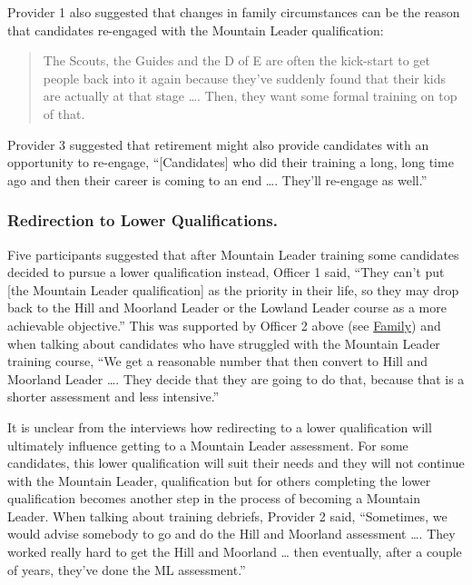 \documentclass[
  12pt,
  a4paper,
]{book}
\begin{document}
Provider 1 also suggested that changes in family circumstances can be the reason that candidates re-engaged with the Mountain Leader qualification:

\begin{quote}
The Scouts, the Guides and the D of E are often the kick-start to get people back into it again because they've suddenly found that their kids are actually at that stage \ldots. Then, they want some formal training on top of that.
\end{quote}

Provider 3 suggested that retirement might also provide candidates with an opportunity to re-engage, ``{[}Candidates{]} who did their training a long, long time ago and then their career is coming to an end \ldots. They'll re-engage as well.''

\hypertarget{ml-qualitative-gta-redirection-lower}{%
\subsubsection{Redirection to Lower Qualifications.}\label{ml-qualitative-gta-redirection-lower}}

Five participants suggested that after Mountain Leader training some candidates decided to pursue a lower qualification instead, Officer 1 said, ``They can't put {[}the Mountain Leader qualification{]} as the priority in their life, so they may drop back to the Hill and Moorland Leader or the Lowland Leader course as a more achievable objective.'' This was supported by Officer 2 above (see \protect\hyperlink{qual-lack-time-familiy}{Family}) and when talking about candidates who have struggled with the Mountain Leader training course, ``We get a reasonable number that then convert to Hill and Moorland Leader \ldots. They decide that they are going to do that, because that is a shorter assessment and less intensive.''

It is unclear from the interviews how redirecting to a lower qualification will ultimately influence getting to a Mountain Leader assessment. For some candidates, this lower qualification will suit their needs and they will not continue with the Mountain Leader, qualification but for others completing the lower qualification becomes another step in the process of becoming a Mountain Leader. When talking about training debriefs, Provider 2 said, ``Sometimes, we would advise somebody to go and do the Hill and Moorland assessment \ldots. They worked really hard to get the Hill and Moorland \ldots{} then eventually, after a couple of years, they've done the ML assessment.''
\end{document}
